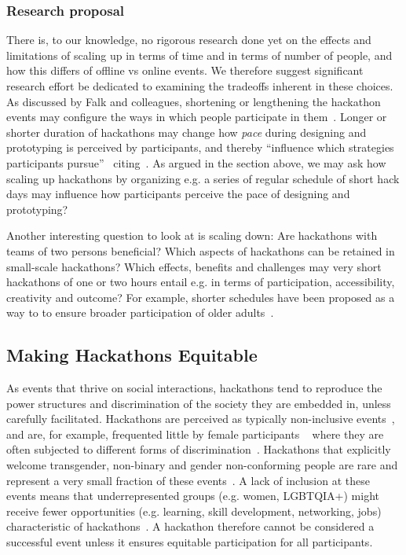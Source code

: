 \documentclass{ieeeaccess}
\begin{document}
\subsubsection{Research proposal}
There is, to our knowledge, no rigorous research done yet on the effects and limitations of scaling up in terms of time and in terms of number of people, and how this differs of offline vs online events. 
We therefore suggest significant research effort be dedicated to examining the tradeoffs inherent in these choices.
As discussed by Falk and colleagues, shortening or lengthening the hackathon events may configure the ways in which people participate in them~\cite{falk2022shortening}.
Longer or shorter duration of hackathons may change how \textit{pace} during designing and prototyping is perceived by participants, and thereby ``influence which strategies participants pursue''~\cite{falk2022shortening} citing~\cite{grzymala2011time}.
As argued in the section above, we may ask how scaling up hackathons by organizing e.g. a series of regular schedule of short hack days may influence how participants perceive the pace of designing and prototyping?

Another interesting question to look at is scaling down: Are hackathons with teams of two persons beneficial?
Which aspects of hackathons can be retained in small-scale hackathons? 
Which effects, benefits and challenges may very short hackathons of one or two hours entail e.g. in terms of participation, accessibility, creativity and outcome?
For example, shorter schedules have been proposed as a way to to ensure broader participation of older adults~\cite{kopec2018older}.

\subsection{Making Hackathons Equitable}
As events that thrive on social interactions, hackathons tend to reproduce the power structures and discrimination of the society they are embedded in, unless carefully facilitated. 
Hackathons are perceived as typically non-inclusive events~\cite{kos2018collegiate}, and are, for example, frequented little by female participants ~\cite{decker2015understanding} where they are often subjected to different forms of discrimination~\cite{paganini2020}. 
Hackathons that explicitly welcome transgender, non-binary and gender non-conforming people are rare and represent a very small fraction of these events~\cite{kumar2019}. 
A lack of inclusion at these events means that underrepresented groups (e.g. women, LGBTQIA+) might receive fewer opportunities (e.g. learning, skill development, networking, jobs) characteristic of hackathons~\cite{warner2017}. 
A hackathon therefore cannot be considered a successful event unless it ensures equitable participation for all participants. 
\end{document}
